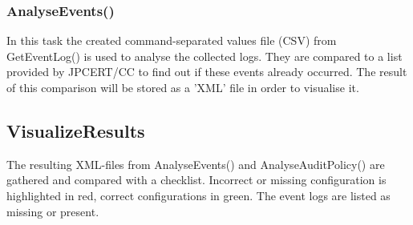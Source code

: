 \subsubsection{AnalyseEvents()}
In this task the created command-separated values file (CSV) from GetEventLog() is used to analyse the collected logs. They are compared to a list provided by JPCERT/CC to find out if these events already occurred. The result of this comparison will be stored as a 'XML' file in order to visualise it.

\subsection{VisualizeResults}
The resulting XML-files from AnalyseEvents() and AnalyseAuditPolicy() are gathered and compared with a checklist. Incorrect or missing configuration is highlighted in red, correct configurations in green. The event logs are listed as missing or present.

